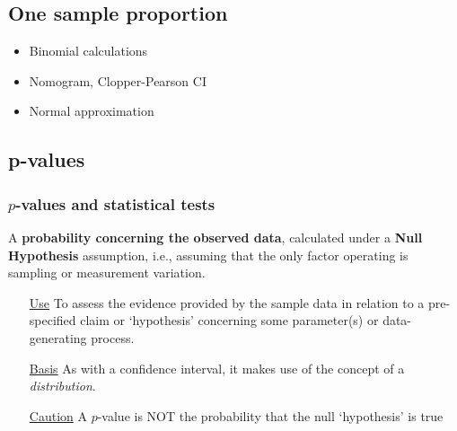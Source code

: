 \documentclass[10pt]{beamer}\usepackage[]{graphicx}\usepackage[]{color}
\begin{document}
\subsection{One sample proportion}

\begin{frame}
	\begin{itemize}
		\item Binomial calculations
		\item Nomogram, Clopper-Pearson CI
		\item Normal approximation
	\end{itemize}
\end{frame}


\subsection{p-values}

\begin{frame}
	\frametitle{$p$-values and statistical tests}
	
	
	\begin{defm}[$p$-value]
		A \textbf{probability concerning the observed data}, calculated under a \textbf{Null Hypothesis} assumption, i.e., assuming that the only factor operating is sampling or measurement variation. 
	\end{defm}
	
	\begin{itemize} 
		\item[\underline{Use}] To assess the evidence provided by the sample data
		in relation to a pre-specified claim or `hypothesis' concerning some parameter(s) or data-generating process. 
		\item[\underline{Basis}] As with a confidence interval, it makes use of the concept of a \textit{distribution}. 
		\item[\underline{Caution}] A $p$-value is NOT the probability that the null `hypothesis' is true
	\end{itemize}
\end{frame}
\end{document}
